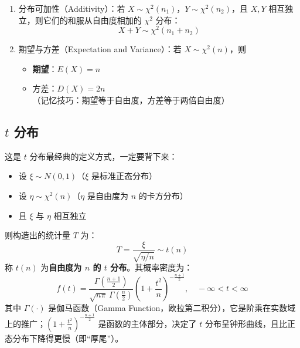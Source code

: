 \begin{property}
\begin{enumerate}[label=(\alph*)]
	\item 分布可加性（Additivity）：若 $X \sim \chi^2(n_1)$，$Y \sim \chi^2(n_2)$，且 $X, Y$ 相互独立，则它们的和服从自由度相加的 $\chi^2$ 分布：
	\begin{equation}
		X + Y \sim \chi^2(n_1 + n_2)
		\label{eq:抽样分布:卡方可加性}
	\end{equation}
	\item 期望与方差（Expectation and Variance）：若 $X \sim \chi^2(n)$，则
	\begin{itemize}
		\item \textbf{期望}：$E(X) = n$
		\item 方差：$D(X) = 2n$（记忆技巧：期望等于自由度，方差等于两倍自由度）
	\end{itemize}
\end{enumerate}
\end{property}

\subsection{$t$ 分布}
\begin{definition}[$t$ 分布（构造）]
这是 $t$ 分布最经典的定义方式，一定要背下来：
\begin{itemize}
	\item 设 $\xi \sim N(0, 1)$（$\xi$ 是标准正态分布）
	\item 设 $\eta \sim \chi^2(n)$（$\eta$ 是自由度为 $n$ 的卡方分布）
	\item 且 $\xi$ 与 $\eta$ 相互独立
\end{itemize}
则构造出的统计量 $T$ 为：
\begin{equation}
	T = \frac{\xi}{\sqrt{\eta / n}} \sim t(n)
	\label{eq:抽样分布:t构造}
\end{equation}
称 $t(n)$ 为\textbf{自由度为 $n$ 的 $t$ 分布}。其概率密度为：
\begin{equation}
	f(t) = \frac{\Gamma\left(\frac{n+1}{2}\right)}{\sqrt{n\pi}\,\Gamma\left(\frac{n}{2}\right)} \left(1+\frac{t^2}{n}\right)^{-\frac{n+1}{2}}, \quad -\infty < t < \infty
	\label{eq:抽样分布:t密度}
\end{equation}
其中 $\Gamma(\cdot)$ 是伽马函数（Gamma Function，欧拉第二积分），它是阶乘在实数域上的推广；$\left(1+\frac{t^2}{n}\right)^{-\frac{n+1}{2}}$ 是函数的主体部分，决定了 $t$ 分布呈钟形曲线，且比正态分布下降得更慢（即“厚尾”）。
\end{definition}


